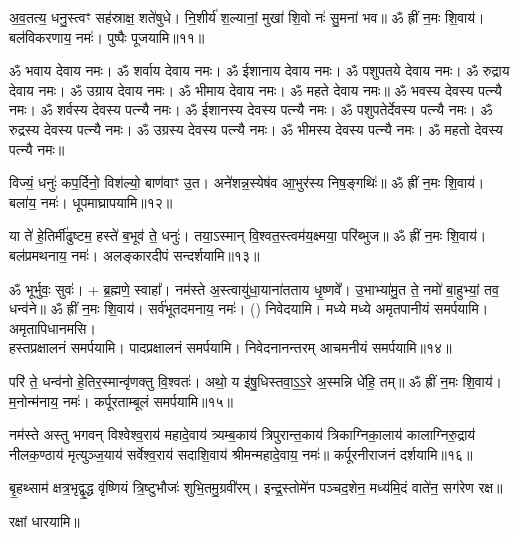 अ॒व॒तत्य॒ धनु॒स्त्वꣳ सह॑स्राक्ष॒ शते॑षुधे। नि॒शीर्य॑ श॒ल्यानां॒ मुखा॑ शि॒वो नः॑ सु॒मना॑ भव॥ ॐ ह्रीं न॒मः शि॒वाय॑। बल॑विकरणाय॒ नमः॑। पुष्पैः पूजयामि॥११॥


ॐ भवाय देवाय नमः। ॐ शर्वाय देवाय नमः। ॐ ईशानाय देवाय नमः। ॐ पशुपतये देवाय नमः। ॐ रुद्राय देवाय नमः। ॐ उग्राय देवाय नमः। ॐ भीमाय देवाय नमः। ॐ महते देवाय नमः॥
ॐ भवस्य देवस्य पत्न्यै नमः। ॐ शर्वस्य देवस्य पत्न्यै नमः। ॐ ईशानस्य देवस्य पत्न्यै नमः। ॐ पशुपतेर्देवस्य पत्न्यै नमः। ॐ रुद्रस्य देवस्य पत्न्यै नमः। ॐ उग्रस्य देवस्य पत्न्यै नमः। ॐ भीमस्य देवस्य पत्न्यै नमः। ॐ महतो देवस्य पत्न्यै नमः॥ 

विज्यं॒ धनुः॑ कप॒र्दिनो॒ विश॑ल्यो॒ बाण॑वाꣳ उ॒त। अने॑शन्न॒\-स्येष॑व आ॒भुर॑स्य निष॒ङ्गथिः॑॥ ॐ ह्रीं न॒मः शि॒वाय॑। बला॑य॒ नमः॑। धूपमाघ्रापयामि॥१२॥

या ते॑ हे॒तिर्मी॑ढुष्टम॒ हस्ते॑ ब॒भूव॑ ते॒ धनुः॑। तया॒ऽस्मान् वि॒श्वत॒स्त्वम॑य॒क्ष्मया॒ परि॑ब्भुज॥ ॐ ह्रीं न॒मः शि॒वाय॑। बल॑प्रमथनाय॒ नमः॑। अलङ्कारदीपं सन्दर्शयामि॥१३॥

{ॐ भूर्भुवः॒ सुवः॑। + ब्र॒ह्मणे॒ स्वाहा᳚।} नम॑स्ते अ॒स्त्वायु॑धा॒याना॑तताय धृ॒ष्णवे᳚। उ॒भाभ्या॑मु॒त ते॒ नमो॑ बा॒हुभ्यां॒ तव॒ धन्व॑ने॥ ॐ ह्रीं न॒मः शि॒वाय॑। सर्व॑भूतदमनाय॒ नमः॑। () निवेदयामि। मध्ये मध्ये अमृतपानीयं समर्पयामि। अमृतापिधानमसि।\\
हस्तप्रक्षालनं समर्पयामि। पादप्रक्षालनं समर्पयामि। निवेदनानन्तरम् आचमनीयं समर्पयामि॥१४॥

परि॑ ते॒ धन्व॑नो हे॒तिर॒स्मान्वृ॑णक्तु वि॒श्वतः॑। अथो॒ य इ॑षु॒धिस्तवा॒ऽ॒ऽ॒रे अ॒स्मन्नि धे॑हि॒ तम्॥ ॐ ह्रीं न॒मः शि॒वाय॑। म॒नोन्म॑नाय॒ नमः॑। कर्पूरताम्बूलं समर्पयामि॥१५॥

नम॑स्ते अस्तु भगवन् विश्वेश्व॒राय॑ महादे॒वाय॑ त्र्यम्ब॒काय॑ त्रिपुरान्त॒काय॑ त्रिकाग्निका॒लाय॑ कालाग्निरु॒द्राय॑ नीलक॒ण्ठाय॑ मृत्युञ्ज॒याय॑ सर्वेश्व॒राय॑ सदाशि॒वाय॑ श्रीमन्महादे॒वाय॒ नमः॑॥ कर्पूरनीराजनं दर्शयामि॥१६॥

बृ॒हथ्साम॑ क्षत्र॒भृद्वृ॒द्ध वृ॑ष्णियं त्रि॒ष्टुभौजः॑ शुभि॒तमु॒ग्रवी॑रम्।
इन्द्र॒स्तोमे॑न पञ्चद॒शेन॒ मध्य॑मि॒दं वाते॑न॒ सग॑रेण रक्ष॥

रक्षां धारयामि॥


{\small\closesection}


